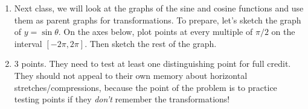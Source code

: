 \documentclass{article}
\begin{document}
\begin{enumerate}






\item 

\begin{problem}
    Next class, we will look at the graphs of the sine and cosine functions and use them as parent graphs for transformations. To prepare, let's sketch the graph of $y=\sin\theta$. On the axes below, plot points at every multiple of $\pi/2$ on the interval $[-2\pi, 2\pi]$. Then sketch the rest of the graph.
\end{problem}

\begin{center}
\end{center}

\item 

\begin{grading}
3 points. They need to test at least one distinguishing point for full credit. They should not appeal to their own memory about horizontal stretches/compressions, because the point of the problem is to practice testing points if they \textit{don't} remember the transformations!
\end{grading}


\end{enumerate}
\end{document}
